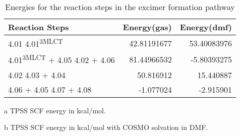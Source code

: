 \begin{table}[!htb]
\centering
 \begin{threeparttable}
  \caption{Energies for the reaction steps in the excimer formation pathway}
    \begin{tabular}{lrr}
    \toprule
    Reaction Steps & Energy(gas)\tnote{a} & Energy(dmf)\tnote{b} \\
    \midrule
    4.01 \ce{->} 4.01\textsuperscript{3MLCT} & 42.81191677 &	53.40083976 \\
    4.01\textsuperscript{3MLCT} + 4.05 \ce{->} 4.02 + 4.06 & 81.44966532	& -5.80393275 \\
    4.02 \ce{->} 4.03 + 4.04 & 50.816912 & 15.440887 \\
    4.06 + 4.05 \ce{->} 4.07 + 4.08 & -1.077024 & -2.915901 \\
    \bottomrule
    \end{tabular}%
    \begin{tablenotes}
    \item [a] TPSS SCF energy in kcal/mol.
    \item [b] TPSS SCF energy in kcal/mol with COSMO solvation in DMF.
    \end{tablenotes}
  \label{tab.suprxn}%
 \end{threeparttable}
\end{table}%


